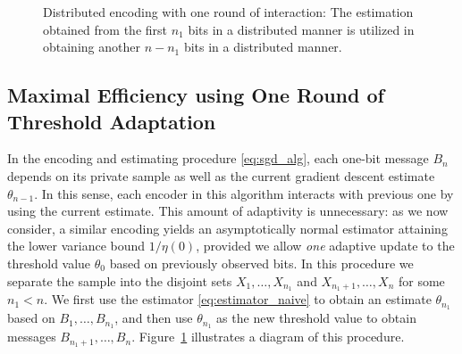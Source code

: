 \begin{figure}
\begin{center}
\end{center}
\caption{Distributed encoding with one round of interaction: The estimation obtained from the first $n_1$ bits in a distributed manner is utilized in obtaining another $n-n_1$ bits in a distributed manner. 
\label{fig:one_round}
}
\end{figure}

\subsection{Maximal Efficiency using One Round of Threshold Adaptation}


In the encoding and estimating procedure \eqref{eq:sgd_alg}, each one-bit
message $B_n$ depends on its private sample as well as the current gradient
descent estimate $\theta_{n-1}$. In this sense, each encoder in this
algorithm interacts with previous one by using the current estimate.  This
amount of adaptivity is unnecessary: as we now consider, a similar encoding
yields an asymptotically normal estimator attaining the lower variance bound
$1/\eta(0)$, provided we allow \emph{one} adaptive update to the threshold
value $\theta_0$ based on previously observed bits.
%
In this procedure we separate the sample into the disjoint sets
$X_1,\ldots,X_{n_1}$ and $X_{n_1+1},\ldots,X_n$ for some $n_1 < n$.  We
first use the estimator \eqref{eq:estimator_naive} to obtain an estimate
${\theta}_{n_1}$ based on $B_1,\ldots,B_{n_1}$, and then use
${\theta}_{n_1}$ as the new threshold value to obtain messages $B_{n_1+1},
\ldots, B_n$. Figure~\ref{fig:one_round} illustrates a diagram of this
procedure.

